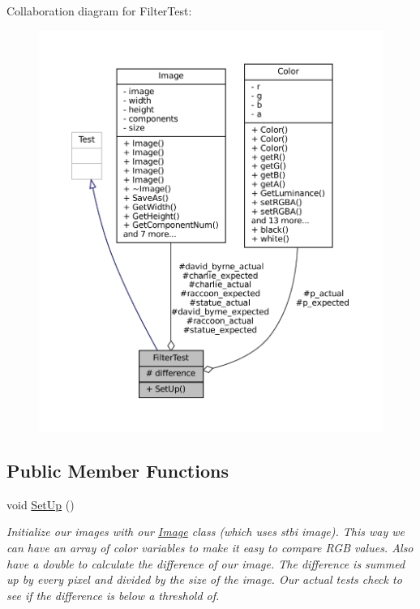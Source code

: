 Collaboration diagram for Filter\+Test\+:\nopagebreak
\begin{figure}[H]
\begin{center}
\leavevmode
\includegraphics[width=350pt]{classFilterTest__coll__graph}
\end{center}
\end{figure}
\subsection*{Public Member Functions}
\begin{DoxyCompactItemize}
\item 
\mbox{\label{classFilterTest_a567f17364b9c42da462b48570e518611}} 
void \hyperlink{classFilterTest_a567f17364b9c42da462b48570e518611}{Set\+Up} ()
\begin{DoxyCompactList}\small\item\em Initialize our images with our \hyperlink{classImage}{Image} class (which uses stbi image). This way we can have an array of color variables to make it easy to compare R\+GB values. Also have a double to calculate the difference of our image. The difference is summed up by every pixel and divided by the size of the image. Our actual tests check to see if the difference is below a threshold of. \end{DoxyCompactList}\end{DoxyCompactItemize}
